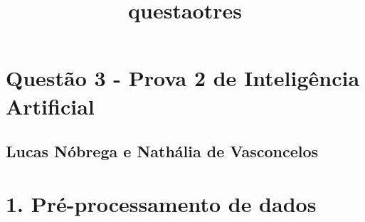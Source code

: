 \documentclass[11pt]{article}
\title{questaotres}
\begin{document}
    
    
    \maketitle
    
    

    
    \section{Questão 3 - Prova 2 de Inteligência
Artificial}\label{questuxe3o-3---prova-2-de-inteliguxeancia-artificial}

\subsection{Lucas Nóbrega e Nathália de
Vasconcelos}\label{lucas-nuxf3brega-e-nathuxe1lia-de-vasconcelos}

\section{1. Pré-processamento de
dados}\label{pruxe9-processamento-de-dados}
\end{document}
